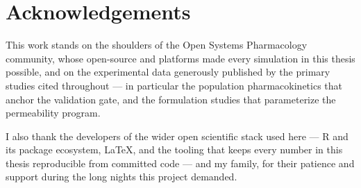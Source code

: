 \chapter*{Acknowledgements}

This work stands on the shoulders of the Open Systems Pharmacology community, whose open-source  and  platforms made every simulation in this thesis possible, and on the experimental data generously published by the primary studies cited throughout --- in particular the population pharmacokinetics that anchor the validation gate, and the formulation studies that parameterize the permeability program.

I also thank the developers of the wider open scientific stack used here --- R and its package ecosystem, \LaTeX, and the tooling that keeps every number in this thesis reproducible from committed code --- and my family, for their patience and support during the long nights this project demanded.

